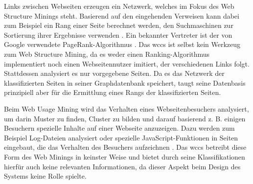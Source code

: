         Links zwischen Webseiten erzeugen ein Netzwerk,
        welches im Fokus des Web Structure Minings steht.
        Basierend auf den eingehenden Verweisen kann dabei zum Beispiel
        ein Rang einer Seite berechnet werden,
        den Suchmaschinen zur Sortierung ihrer Ergebnisse verwenden
        \cite[Part I]{markov:webMining}.
        Ein bekannter Vertreter ist der von Google verwendete PageRank-Algorithmus
        \cite{page:pageRank}.
        Das \gls{wccs} ist selbst kein Werkzeug zum Web Structure Mining,
        da es weder einen Ranking-Algorithmus implementiert
        noch einen Webseitennutzer imitiert, der verschiedenen Links folgt.
        Stattdessen analysiert es nur vorgegebene Seiten.
        Da es das Netzwerk der klassifizierten Seiten in seiner Graphdatenbank speichert,
        taugt seine Datenbasis prinzipiell aber für die Ermittlung eines Rangs
        der klassifizierten Seiten.

        Beim Web Usage Mining wird das Verhalten eines Webseitenbesuchers analysiert,
        um darin Muster zu finden, Cluster zu bilden und darauf basierend z. B.
        einigen Besuchern spezielle Inhalte auf einer Webseite anzuzeigen.
        Dazu werden zum Beispiel Log-Dateien analysiert oder spezielle JavaScript-Funktionen
        in Seiten eingebaut, die das Verhalten des Besuchers aufzeichnen
        \cite[Part III]{markov:webMining}.
        Das \gls{wccs} betreibt diese Form des Web Minings in keinster Weise
        und bietet durch seine Klassifikationen hierfür auch keine relevanten Informationen,
        da dieser Aspekt beim Design des Systems keine Rolle spielte.

